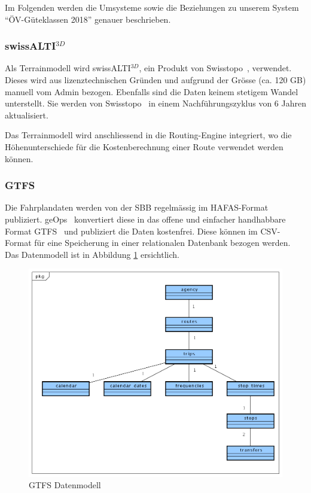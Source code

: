 Im Folgenden werden die Umsysteme sowie die Beziehungen zu unserem System "`ÖV-Güteklassen 2018"' genauer beschrieben.

\subsubsection{swissALTI$^{3D}$}
\label{subsystem:swissALTI3D}

Als \gls{Terrainmodell} wird swissALTI$^{3D}$, ein Produkt von Swisstopo~\cite{swissalti3d_swisstopo}, verwendet.
Dieses wird aus lizenztechnischen Gründen und aufgrund der Grösse (ca. 120 GB) manuell vom Admin bezogen.
Ebenfalls sind die Daten keinem stetigem Wandel unterstellt.
Sie werden von Swisstopo~\cite{swissalti3d_swisstopo} in einem Nachführungszyklus von 6 Jahren aktualisiert.

Das \gls{Terrainmodell} wird anschliessend in die Routing-Engine integriert, wo die Höhenunterschiede für die Kostenberechnung einer Route verwendet werden können.

\subsubsection{GTFS}
\label{subsystem:GTFS}

Die Fahrplandaten werden von der SBB regelmässig im HAFAS-Format~\cite{sbb_hafas_spec} publiziert.
geOps~\cite{geops_fahrplandaten} konvertiert diese in das offene und einfacher handhabbare Format \ac{GTFS}~\cite{gtfs_spec} und publiziert die Daten kostenfrei.
Diese können im CSV-Format für eine Speicherung in einer relationalen Datenbank bezogen werden.
Das Datenmodell ist in Abbildung \ref{fig:GTFS_data_model} ersichtlich.

\begin{figure}[ht]
    \centering
    \includegraphics[width=1.0\linewidth]{projectdoc/img/GTFS_data_model}
    \caption[GTFS Datenmodell]{GTFS Datenmodell}
    \label{fig:GTFS_data_model}
\end{figure}

